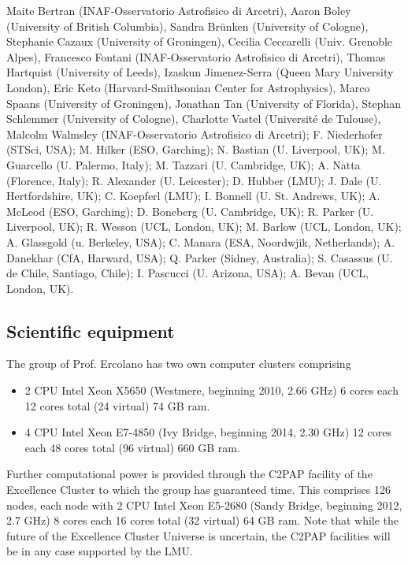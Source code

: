\documentclass[10pt,fleqn,twoside]{article}
\newcommand{\Tcol}{\color{blue}}
\begin{document}
Maite Bertran (INAF-Osservatorio Astrofisico di Arcetri), Aaron Boley (University of British Columbia), Sandra Brünken (University of Cologne), Stephanie Cazaux (University of Groningen), Cecilia Ceccarelli (Univ. Grenoble Alpes), Francesco Fontani (INAF-Osservatorio Astrofisico di Arcetri), Thomas Hartquist (University of Leeds), Izaskun Jimenez-Serra (Queen Mary University London), Eric Keto (Harvard-Smithsonian Center for Astrophysics), Marco Spaans (University of Groningen), Jonathan Tan (University of Florida), Stephan Schlemmer (University of Cologne), Charlotte Vastel (Université de Tulouse), Malcolm Walmsley (INAF-Osservatorio Astrofisico di Arcetri);
F. Niederhofer (STSci, USA); M. Hilker (ESO, Garching); N. Bastian (U. Liverpool,
UK); M. Guarcello (U. Palermo, Italy); M. Tazzari (U. Cambridge, UK);
A. Natta (Florence, Italy); R. Alexander (U. Leicester); D. Hubber
(LMU); J. Dale (U. Hertfordshire, UK); C. Koepferl (LMU); I. Bonnell
(U. St. Andrews, UK); A. McLeod (ESO, Garching); D. Boneberg
(U. Cambridge, UK); R. Parker (U. Liverpool, UK); R. Wesson (UCL,
London, UK); M. Barlow (UCL, London, UK); A. Glassgold (u. Berkeley,
USA); C. Manara (ESA, Noordwjik, Netherlands); A. Danekhar (CfA,
Harward, USA); Q. Parker (Sidney, Australia); S. Casassus
(U. de Chile, Santiago, Chile); I. Pascucci (U. Arizona, USA);
A. Bevan (UCL, London, UK).

\subsection{\Tcol Scientific equipment}



The group of Prof. Ercolano has two own computer clusters comprising 

\begin{itemize}
\item 2 CPU Intel Xeon X5650 (Westmere, beginning
2010, 2.66 GHz) 6 cores each 12 cores total (24 virtual) 74 GB ram.

\item 4 CPU Intel Xeon E7-4850 (Ivy Bridge, beginning 2014, 2.30 GHz)
12 cores each 48 cores total (96 virtual) 660 GB ram.

\end{itemize}

Further computational power is provided through the C2PAP facility of the Excellence Cluster to which
the group has guaranteed time. This comprises 126 nodes, each node with 2 CPU Intel Xeon E5-2680 (Sandy
Bridge, beginning 2012, 2.7 GHz) 8 cores each 16 cores total (32
virtual) 64 GB ram. Note that while the future of the Excellence
Cluster Universe is uncertain, the C2PAP facilities will be in any
case supported by the LMU. 
\end{document}
